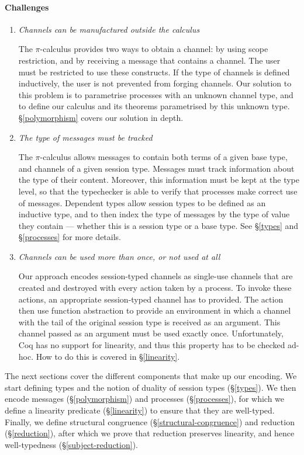\documentclass{mproj}
\newcommand{\picalc}{$\pi$-calculus}
\begin{document}
\paragraph{Challenges}
\begin{enumerate}
    \item \emph{Channels can be manufactured outside the calculus}

    The \picalc{} provides two ways to obtain a channel: by using scope restriction, and by receiving a message that contains a channel. The user must be restricted to use these constructs. If the type of channels is defined inductively, the user is not prevented from forging channels. Our solution to this problem is to parametrise processes with an unknown channel type, and to define our calculus and its theorems parametrised by this unknown type. \S \ref{polymorphism} covers our solution in depth.

    \item \emph{The type of messages must be tracked}

    The \picalc{} allows messages to contain both terms of a given base type, and channels of a given session type. Messages must track information about the type of their content. Moreover, this information must be kept at the type level, so that the typechecker is able to verify that processes make correct use of messages. Dependent types allow session types to be defined as an inductive type, and to then index the type of messages by the type of value they contain --- whether this is a session type or a base type. See \S \ref{types} and \S \ref{processes} for more details.

    \item \emph{Channels can be used more than once, or not used at all}

    Our approach encodes session-typed channels as single-use channels that are created and destroyed with every action taken by a process. To invoke these actions, an appropriate session-typed channel has to provided. The action then use function abstraction to provide an environment in which a channel with the tail of the original session type is received as an argument. This channel passed as an argument must be used exactly once. Unfortunately, Coq has no support for linearity, and thus this property has to be checked ad-hoc. How to do this is covered in \S \ref{linearity}.
\end{enumerate}

The next sections cover the different components that make up our encoding. We start defining types and the notion of duality of session types (\S \ref{types}). We then encode messages (\S \ref{polymorphism}) and processes (\S \ref{processes}), for which we define a linearity predicate (\S \ref{linearity}) to ensure that they are well-typed. Finally, we define structural congruence (\S \ref{structural-congruence}) and reduction (\S \ref{reduction}), after which we prove that reduction preserves linearity, and hence well-typedness (\S \ref{subject-reduction}).
\end{document}

